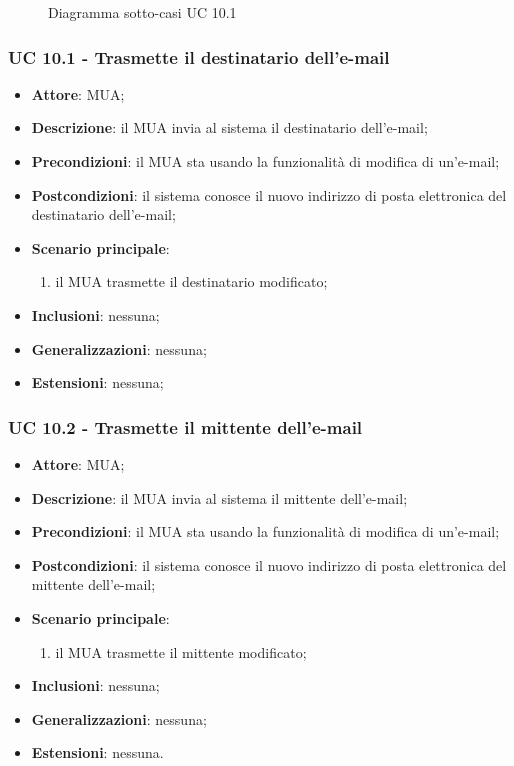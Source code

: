     \begin{figure}[h]
        \centering
        \caption{Diagramma sotto-casi UC 10.1}
    \end{figure}

    \subsubsection{UC 10.1 - Trasmette il destinatario dell'e-mail} \label{sec:UC10.1}
    \begin{itemize}
        \item \textbf{Attore}: MUA;
        \item \textbf{Descrizione}: il MUA invia al sistema il destinatario dell'e-mail;
        \item \textbf{Precondizioni}: il MUA sta usando la funzionalità di modifica di un'e-mail;
        \item \textbf{Postcondizioni}: il sistema conosce il nuovo indirizzo di posta elettronica del destinatario dell'e-mail;
        \item \textbf{Scenario principale}:
            \begin{enumerate}
                \item il MUA trasmette il destinatario modificato;
            \end{enumerate}
        \item \textbf{Inclusioni}: nessuna;
        \item \textbf{Generalizzazioni}: nessuna;
        \item \textbf{Estensioni}: nessuna;
    \end{itemize}

    \subsubsection{UC 10.2 - Trasmette il mittente dell'e-mail} \label{sec:UC10.2}
    \begin{itemize}
        \item \textbf{Attore}: MUA;
        \item \textbf{Descrizione}: il MUA invia al sistema il mittente dell'e-mail;
        \item \textbf{Precondizioni}: il MUA sta usando la funzionalità di modifica di un'e-mail;
        \item \textbf{Postcondizioni}: il sistema conosce il nuovo indirizzo di posta elettronica del mittente dell'e-mail;
        \item \textbf{Scenario principale}:
            \begin{enumerate}
                \item il MUA trasmette il mittente modificato;
            \end{enumerate}
        \item \textbf{Inclusioni}: nessuna;
        \item \textbf{Generalizzazioni}: nessuna;
        \item \textbf{Estensioni}: nessuna.
    \end{itemize}

